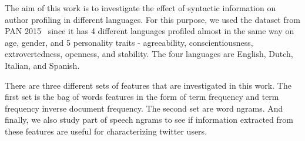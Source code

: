 \documentclass[a4paper]{llncs}
\begin{document}
The aim of this work is to investigate the effect of syntactic information on author profiling in different languages. For this purpose, we used the dataset from PAN 2015~\cite{rangel:2015} since it has 4 different languages profiled almost in the same way on age, gender, and 5 personality traits - agreeability, conscientiousness, extrovertedness, openness, and stability. The four languages are English, Dutch, Italian, and Spanish. 

There are three different sets of features that are investigated in this work. The first set is the bag of words features in the form of term frequency and term frequency inverse document frequency. The second set are word ngrams. And finally, we also study part of speech ngrams to see if information extracted from these features are useful for characterizing twitter users.

%
%
%
\end{document}
